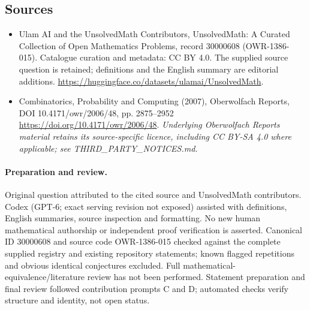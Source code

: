 \documentclass[11pt]{article}
\begin{document}
\subsection{Sources}
\begin{itemize}
\item[\hypertarget{source:30000608:1}{S1}] Ulam AI and the UnsolvedMath Contributors, UnsolvedMath: A Curated Collection of Open Mathematics Problems, record 30000608 (OWR-1386-015). Catalogue curation and metadata: CC BY 4.0. The supplied source question is retained; definitions and the English summary are editorial additions.
\url{https://huggingface.co/datasets/ulamai/UnsolvedMath}.
\item[\hypertarget{source:30000608:2}{S2}] Combinatorics, Probability and Computing (2007), Oberwolfach Reports, DOI 10.4171/owr/2006/48, pp. 2875--2952
\url{https://doi.org/10.4171/owr/2006/48}.
\textit{Underlying Oberwolfach Reports material retains its source-specific licence, including CC BY-SA 4.0 where applicable; see THIRD\_PARTY\_NOTICES.md.}
\end{itemize}
\paragraph{Preparation and review.}
Original question attributed to the cited source and UnsolvedMath contributors. Codex (GPT-6; exact serving revision not exposed) assisted with definitions, English summaries, source inspection and formatting. No new human mathematical authorship or independent proof verification is asserted. Canonical ID 30000608 and source code OWR-1386-015 checked against the complete supplied registry and existing repository statements; known flagged repetitions and obvious identical conjectures excluded. Full mathematical-equivalence/literature review has not been performed. Statement preparation and final review followed contribution prompts C and D; automated checks verify structure and identity, not open status.
\label{end:30000608}
\end{document}
